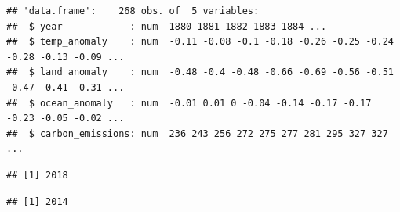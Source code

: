 \documentclass[
]{article}
\newenvironment{Shaded}{\begin{snugshade}}{\end{snugshade}}
\newcommand{\CommentTok}[1]{\textcolor[rgb]{0.56,0.35,0.01}{\textit{#1}}}
\newcommand{\KeywordTok}[1]{\textcolor[rgb]{0.13,0.29,0.53}{\textbf{#1}}}
\newcommand{\NormalTok}[1]{#1}
\newcommand{\OperatorTok}[1]{\textcolor[rgb]{0.81,0.36,0.00}{\textbf{#1}}}
\newcommand{\StringTok}[1]{\textcolor[rgb]{0.31,0.60,0.02}{#1}}
\begin{document}
\begin{verbatim}
## 'data.frame':    268 obs. of  5 variables:
##  $ year            : num  1880 1881 1882 1883 1884 ...
##  $ temp_anomaly    : num  -0.11 -0.08 -0.1 -0.18 -0.26 -0.25 -0.24 -0.28 -0.13 -0.09 ...
##  $ land_anomaly    : num  -0.48 -0.4 -0.48 -0.66 -0.69 -0.56 -0.51 -0.47 -0.41 -0.31 ...
##  $ ocean_anomaly   : num  -0.01 0.01 0 -0.04 -0.14 -0.17 -0.17 -0.23 -0.05 -0.02 ...
##  $ carbon_emissions: num  236 243 256 272 275 277 281 295 327 327 ...
\end{verbatim}

\begin{Shaded}
\end{Shaded}

\begin{verbatim}
## [1] 2018
\end{verbatim}

\begin{Shaded}
\end{Shaded}

\begin{verbatim}
## [1] 2014
\end{verbatim}

\begin{Shaded}
\end{Shaded}
\end{document}
